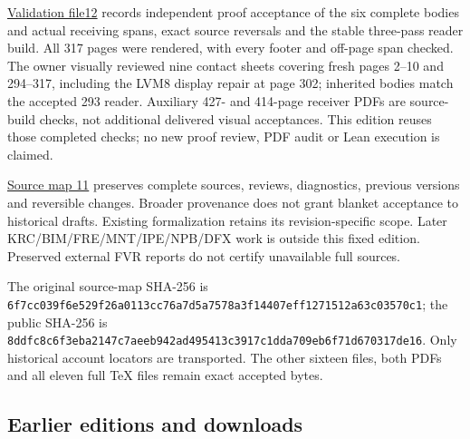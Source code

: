 \documentclass[
]{article}
\begin{document}
\href{https://github.com/KokunoYumeto/zeta-function-research-reader/blob/88cec321ccb455d1906d4abce7dc08bea6c7676d/workbenches/splitzero-tandem/continuations/20260915-allocation-continuation/12_VALIDATION.md}{Validation
file12} records independent proof acceptance of the six complete bodies
and actual receiving spans, exact source reversals and the stable
three-pass reader build. All 317 pages were rendered, with every footer
and off-page span checked. The owner visually reviewed nine contact
sheets covering fresh pages 2--10 and 294--317, including the LVM8
display repair at page 302; inherited bodies match the accepted 293
reader. Auxiliary 427- and 414-page receiver PDFs are source-build
checks, not additional delivered visual acceptances. This edition reuses
those completed checks; no new proof review, PDF audit or Lean execution
is claimed.

\href{https://github.com/KokunoYumeto/zeta-function-research-reader/blob/88cec321ccb455d1906d4abce7dc08bea6c7676d/workbenches/splitzero-tandem/continuations/20260915-allocation-continuation/11_SOURCE_MAP.json}{Source
map 11} preserves complete sources, reviews, diagnostics, previous
versions and reversible changes. Broader provenance does not grant
blanket acceptance to historical drafts. Existing formalization retains
its revision-specific scope. Later KRC/BIM/FRE/MNT/IPE/NPB/DFX work is
outside this fixed edition. Preserved external FVR reports do not
certify unavailable full sources.

The original source-map SHA-256 is
\texttt{6f7cc039f6e529f26a0113cc76a7d5a7578a3f14407eff1271512a63c03570c1};
the public SHA-256 is
\texttt{8ddfc8c6f3eba2147c7aeeb942ad495413c3917c1dda709eb6f71d670317de16}.
Only historical account locators are transported. The other sixteen
files, both PDFs and all eleven full TeX files remain exact accepted
bytes.

\subsection{Earlier editions and
downloads}\label{earlier-editions-and-downloads}
\end{document}
